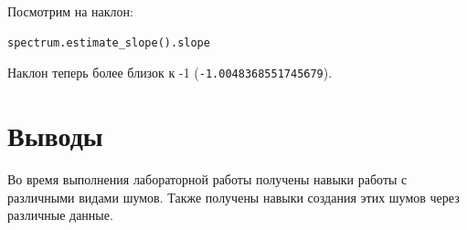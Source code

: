 \documentclass[a4paper,12pt]{report}
\begin{document}
Посмотрим на наклон:

\begin{lstlisting}[caption=Наклон прямой]
spectrum.estimate_slope().slope
\end{lstlisting}

Наклон теперь более близок к -1 (\texttt{-1.0048368551745679}).

\chapter{Выводы}

Во время выполнения лабораторной работы получены навыки работы с различными видами шумов. Также получены навыки создания этих шумов через различные данные.
\end{document}
